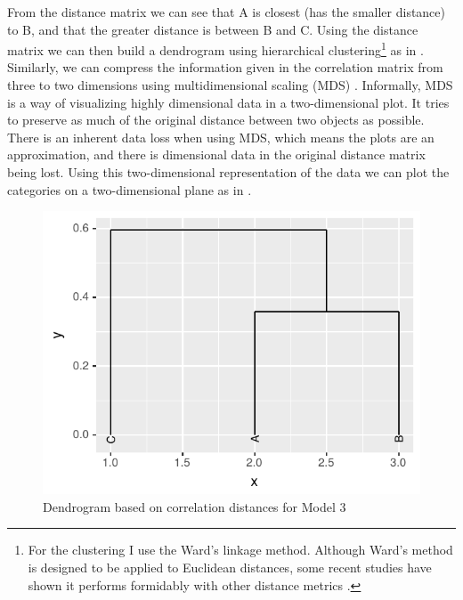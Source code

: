 From the distance matrix we can see that A is closest (has the smaller distance) to B, and that the greater distance is between B and C. Using the distance matrix we can then build a dendrogram using hierarchical clustering\footnote{For the clustering I use the Ward's linkage method. Although Ward's method \autocite{Murtagh.2014} is designed to be applied to Euclidean distances, some recent studies have shown it performs formidably with other distance metrics \autocites{Meyniel.2010, Strauss.2017}.} \autocite{Rokach.2005} as in . Similarly, we can compress the information given in the correlation matrix from three to two dimensions using multidimensional scaling (MDS) \autocite{Borg.2005, Cysouw.2007c}. Informally, MDS is a way of visualizing highly dimensional data in a two-dimensional plot. It tries to preserve as much of the original distance between two objects as possible. There is an inherent data loss when using MDS, which means the plots are an approximation, and there is dimensional data in the original distance matrix being lost. Using this two-dimensional representation of the data we can plot the categories on a two-dimensional plane as in .

\begin{figure}[!htpb]
  \centering
  \includegraphics{./figures/fake/dendro3.pdf}
  \caption{Dendrogram based on correlation distances for Model 3}\label{fig:dendro-model3}
\end{figure}

